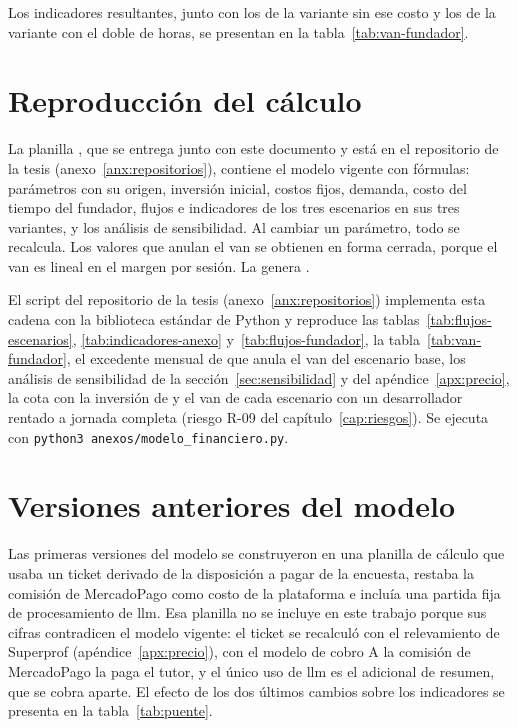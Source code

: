 Los indicadores resultantes, junto con los de la variante sin ese costo
y los de la variante con el doble de horas, se presentan en la
tabla~\ref{tab:van-fundador}.

\section{Reproducción del cálculo}

La planilla , que se entrega junto con
este documento y está en el repositorio de la tesis
(anexo~\ref{anx:repositorios}), contiene el modelo vigente con fórmulas:
parámetros con su origen, inversión inicial, costos fijos, demanda, costo
del tiempo del fundador, flujos e indicadores de los tres escenarios en
sus tres variantes, y los análisis de sensibilidad. Al cambiar un
parámetro, todo se recalcula. Los valores que anulan el \gls{van} se
obtienen en forma cerrada, porque el \gls{van} es lineal en el margen
por sesión. La genera .

El script  del repositorio de la tesis
(anexo~\ref{anx:repositorios}) implementa esta cadena con la biblioteca
estándar de Python y reproduce las tablas~\ref{tab:flujos-escenarios},
\ref{tab:indicadores-anexo} y~\ref{tab:flujos-fundador}, la
tabla~\ref{tab:van-fundador}, el excedente mensual de  que
anula el \gls{van} del escenario base, los análisis de sensibilidad de la
sección~\ref{sec:sensibilidad} y del apéndice~\ref{apx:precio}, la cota
con la inversión de  y el \gls{van} de cada escenario con un
desarrollador rentado a jornada completa (riesgo R-09 del
capítulo~\ref{cap:riesgos}). Se ejecuta con
\texttt{python3 anexos/modelo\_financiero.py}.

\section{Versiones anteriores del modelo}

Las primeras versiones del modelo se construyeron en una planilla de
cálculo que usaba un ticket derivado de la disposición a pagar de la
encuesta, restaba la comisión de MercadoPago como costo de la plataforma
e incluía una partida fija de procesamiento de \gls{llm}. Esa planilla no
se incluye en este trabajo porque sus cifras contradicen el modelo
vigente: el ticket se recalculó con el relevamiento de Superprof
(apéndice~\ref{apx:precio}), con el modelo de cobro A la comisión de
MercadoPago la paga el tutor, y el único uso de \gls{llm} es el adicional
de resumen, que se cobra aparte. El efecto de los dos últimos cambios
sobre los indicadores se presenta en la tabla~\ref{tab:puente}.
